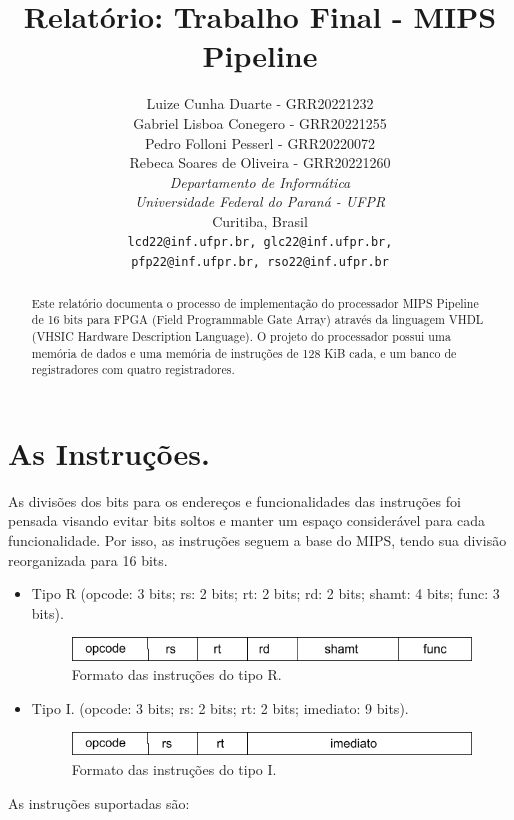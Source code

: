 \documentclass[a4paper, 11pt]{article}
\title{Relatório: Trabalho Final - MIPS Pipeline}
\author{Luize Cunha Duarte - GRR20221232\\
    Gabriel Lisboa Conegero - GRR20221255\\
    Pedro Folloni Pesserl - GRR20220072\\
    Rebeca Soares de Oliveira - GRR20221260\\
\textit{Departamento de Informática}\\
\textit{Universidade Federal do Paraná - UFPR}\\
Curitiba, Brasil\\
\texttt{lcd22@inf.ufpr.br, glc22@inf.ufpr.br,}\\
\texttt{pfp22@inf.ufpr.br, rso22@inf.ufpr.br}}
\date{}
\begin{document}
\maketitle

\begin{abstract}
\begin{singlespace}
Este relatório documenta o processo de implementação do processador MIPS Pipeline de 16
bits para FPGA (Field Programmable Gate Array) através da linguagem VHDL (VHSIC Hardware
Description Language). O projeto do processador possui uma memória de dados e uma
memória de instruções de 128 KiB cada, e um banco de registradores com quatro
registradores. 
\end{singlespace}
\end{abstract}

\section{As Instruções.}
As divisões dos bits para os endereços e funcionalidades das instruções foi pensada
visando evitar bits soltos e manter um espaço considerável para cada funcionalidade.
Por isso, as instruções seguem a base do MIPS, tendo sua divisão reorganizada para
16 bits.
\begin{itemize}
    \item Tipo R (opcode: 3 bits; rs: 2 bits; rt: 2 bits; rd: 2 bits; shamt: 4 bits;
        func: 3 bits).
        \begin{figure}[h]
        \centering
        \includegraphics[width=.6\textwidth]{tipo-r.png}
        \caption{Formato das instruções do tipo R.}
        \end{figure}

    \item Tipo I. (opcode: 3 bits; rs: 2 bits; rt: 2 bits; imediato: 9 bits).
        \begin{figure}[h]
        \centering
        \includegraphics[width=.6\textwidth]{tipo-i.png}
        \caption{Formato das instruções do tipo I.}
        \end{figure}
\end{itemize}
As instruções suportadas são:
\end{document}
